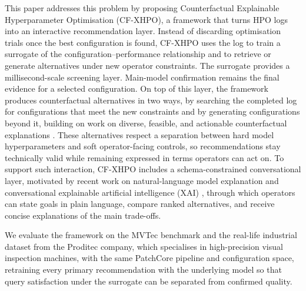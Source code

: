 \documentclass[final,5p,times,twocolumn]{elsarticle}
\begin{document}
This paper addresses this problem by proposing Counterfactual Explainable
Hyperparameter Optimisation (CF-XHPO), a framework that turns HPO logs
into an interactive recommendation layer. Instead of discarding
optimisation trials once the best configuration is found, CF-XHPO uses
the log to train a surrogate of the configuration--performance
relationship and to retrieve or generate alternatives under new
operator constraints. The surrogate provides a millisecond-scale
screening layer. Main-model confirmation remains the final evidence for
a selected configuration. On top of this layer, the framework produces counterfactual alternatives in two ways, by searching the completed log for configurations that meet the new constraints and by generating configurations beyond it, building on work on diverse, feasible, and actionable
counterfactual explanations
\cite{10.1145/3351095.3372850,dandl_multiobjective_2020,poyiadzi_face_2020,DEOLIVEIRA2023}.
These alternatives respect a separation between hard model
hyperparameters and soft operator-facing controls, so recommendations
stay technically valid while remaining expressed in terms operators can
act on. To support such interaction, CF-XHPO includes a schema-constrained
conversational layer, motivated by recent work on natural-language
model explanation and conversational explainable artificial
intelligence (XAI)
\cite{slack_explaining_2023,liao_questioning_2020,he_is_2025}, through
which operators can state goals in plain language, compare ranked
alternatives, and receive concise explanations of the main
trade-offs.



We evaluate the framework on the MVTec benchmark and the real-life industrial dataset from the Proditec company, which specialises in high-precision visual inspection machines, with the same PatchCore pipeline and
configuration space, retraining every primary recommendation with the
underlying model so that query satisfaction under the surrogate can be
separated from confirmed quality.
\end{document}
